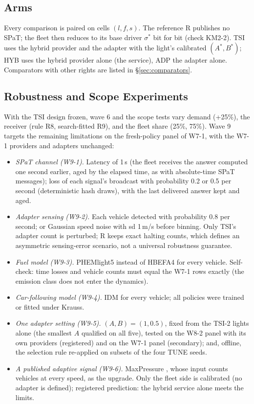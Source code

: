 \subsection{Arms}
Every comparison is paired on cells $(l,f,s)$. The reference R publishes no SPaT; the fleet then reduces to its base driver $\sigma^*$
bit for bit (check KM2-2). TSI uses the hybrid provider and the adapter with the light's calibrated $(A^*,B^*)$; HYB uses the hybrid
provider alone (the service), ADP the adapter alone. Comparators with other rights are listed in §\ref{sec:comparators}.

\subsection{Robustness and Scope Experiments}\label{sec:robustdesign}
With the TSI design frozen, wave 6 and the scope tests vary demand (+25\%), the receiver (rule R8, search-fitted R9), and the fleet share
(25\%, 75\%). Wave 9 targets the remaining limitations on the fresh-policy panel of W7-1, with the W7-1 providers and adapters unchanged:
\begin{itemize}\setlength\itemsep{1pt}
\item \emph{SPaT channel (W9-1).} Latency of 1\,s (the fleet receives the answer computed one second earlier, aged by the elapsed time,
as with absolute-time SPaT messages); loss of each signal's broadcast with probability 0.2 or 0.5 per second (deterministic hash draws),
with the last delivered answer kept and aged.
\item \emph{Adapter sensing (W9-2).} Each vehicle detected with probability 0.8 per second; or Gaussian speed noise with sd 1\,m/s before
binning. Only TSI's adapter count is perturbed; R keeps exact halting counts, which defines an asymmetric sensing-error scenario, not a universal robustness guarantee.
\item \emph{Fuel model (W9-3).} PHEMlight5 instead of HBEFA4 for every vehicle. Self-check: time losses and vehicle counts must equal the
W7-1 rows exactly (the emission class does not enter the dynamics).
\item \emph{Car-following model (W9-4).} IDM for every vehicle; all policies were trained or fitted under Krauss.
\item \emph{One adapter setting (W9-5).} $(A,B)=(1,0.5)$, fixed from the TSI-2 lights alone (the smallest $A$ qualified on all five),
tested on the W8-2 panel with its own providers (registered) and on the W7-1 panel (secondary); and, offline, the selection rule
re-applied on subsets of the four TUNE seeds.
\item \emph{A published adaptive signal (W9-6).} MaxPressure \cite{varaiya2013}, whose input counts vehicles at every speed, as the
upgrade. Only the fleet side is calibrated (no adapter is defined); registered prediction: the hybrid service alone meets the limits.
\end{itemize}

